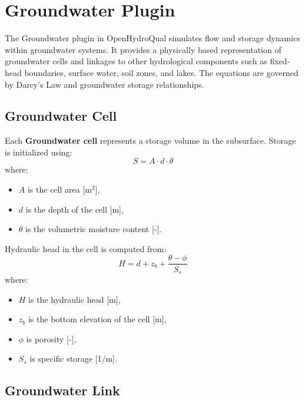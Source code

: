 \documentclass[12pt]{report}
\begin{document}
\chapter{Groundwater Plugin}

The Groundwater plugin in OpenHydroQual simulates flow and storage dynamics within groundwater systems. It provides a physically based representation of groundwater cells and linkages to other hydrological components such as fixed-head boundaries, surface water, soil zones, and lakes. The equations are governed by Darcy's Law and groundwater storage relationships.

\section{Groundwater Cell}

Each \textbf{Groundwater cell} represents a storage volume in the subsurface. Storage is initialized using:
\begin{equation}
S = A \cdot d \cdot \theta
\end{equation}
where:
\begin{itemize}
  \item $A$ is the cell area [m$^2$],
  \item $d$ is the depth of the cell [m],
  \item $\theta$ is the volumetric moisture content [-].
\end{itemize}

Hydraulic head in the cell is computed from:
\begin{equation}
H = d + z_b + \frac{\theta - \phi}{S_s}
\end{equation}
where:
\begin{itemize}
  \item $H$ is the hydraulic head [m],
  \item $z_b$ is the bottom elevation of the cell [m],
  \item $\phi$ is porosity [-],
  \item $S_s$ is specific storage [1/m].
\end{itemize}

\section{Groundwater Link}
\end{document}
